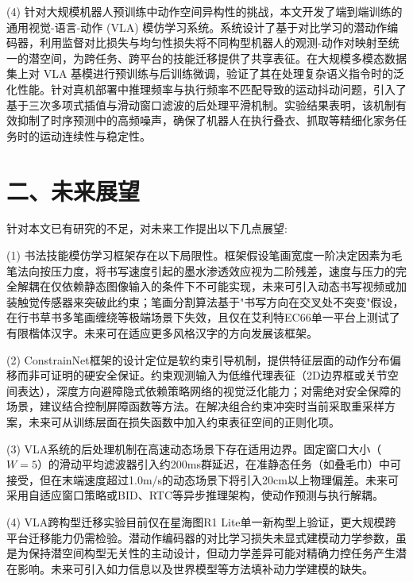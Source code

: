 (4) 针对大规模机器人预训练中动作空间异构性的挑战，本文开发了端到端训练的通用视觉-语言-动作 (VLA) 模仿学习系统。系统设计了基于对比学习的潜动作编码器，利用监督对比损失与均匀性损失将不同构型机器人的观测-动作对映射至统一的潜空间，为跨任务、跨平台的技能迁移提供了共享表征。在大规模多模态数据集上对 VLA 基模进行预训练与后训练微调，验证了其在处理复杂语义指令时的泛化性能。针对真机部署中推理频率与执行频率不匹配导致的运动抖动问题，引入了基于三次多项式插值与滑动窗口滤波的后处理平滑机制。实验结果表明，该机制有效抑制了时序预测中的高频噪声，确保了机器人在执行叠衣、抓取等精细化家务任务时的运动连续性与稳定性。

\section*{二、未来展望}
针对本文已有研究的不足，对未来工作提出以下几点展望:

(1) 书法技能模仿学习框架存在以下局限性。框架假设笔画宽度一阶决定因素为毛笔法向按压力度，将书写速度引起的墨水渗透效应视为二阶残差，速度与压力的完全解耦在仅依赖静态图像输入的条件下不可能实现，未来可引入动态书写视频或加装触觉传感器来突破此约束；笔画分割算法基于"书写方向在交叉处不突变"假设，在行书草书多笔画缠绕等极端场景下失效，且仅在艾利特EC66单一平台上测试了有限楷体汉字。未来可在适应更多风格汉字的方向发展该框架。

(2) ConstrainNet框架的设计定位是软约束引导机制，提供特征层面的动作分布偏移而非可证明的硬安全保证。约束观测输入为低维代理表征（2D边界框或关节空间表达），深度方向避障隐式依赖策略网络的视觉泛化能力；对需绝对安全保障的场景，建议结合控制屏障函数等方法。在解决组合约束冲突时当前采取重采样方案，未来可从训练层面在损失函数中加入约束表征空间的正则化项。

(3) VLA系统的后处理机制在高速动态场景下存在适用边界。固定窗口大小（$W=5$）的滑动平均滤波器引入约200ms群延迟，在准静态任务（如叠毛巾）中可接受，但在末端速度超过1.0m/s的动态场景下将引入20cm以上物理偏差。未来可采用自适应窗口策略或BID、RTC等异步推理架构，使动作预测与执行解耦。

(4) VLA跨构型迁移实验目前仅在星海图R1 Lite单一新构型上验证，更大规模跨平台迁移能力仍需检验。潜动作编码器的对比学习损失未显式建模动力学参数，虽是为保持潜空间构型无关性的主动设计，但动力学差异可能对精确力控任务产生潜在影响。未来可引入如力信息以及世界模型等方法填补动力学建模的缺失。